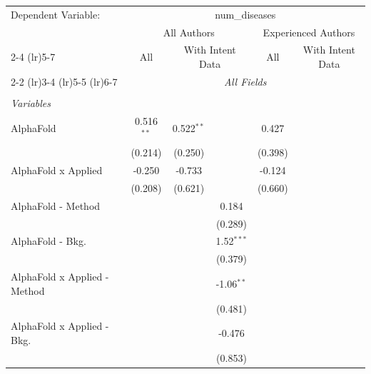 \begingroup
\centering
\begin{tabular}{lcccccc}
   \tabularnewline \midrule \midrule
   Dependent Variable: & \multicolumn{6}{c}{num\_diseases}\\
 & \multicolumn{3}{c}{All Authors} & \multicolumn{3}{c}{Experienced Authors} \\
\cmidrule(lr){2-4} \cmidrule(lr){5-7}
 & \multicolumn{1}{c}{All} & \multicolumn{2}{c}{With Intent Data} & \multicolumn{1}{c}{All} & \multicolumn{2}{c}{With Intent Data} \\
\cmidrule(lr){2-2} \cmidrule(lr){3-4} \cmidrule(lr){5-5} \cmidrule(lr){6-7}
 & \multicolumn{6}{c}{\textit{All Fields}} \\ \\
   \emph{Variables}\\
   AlphaFold                      & 0.516$^{**}$ & 0.522$^{**}$  &              & 0.427        &        &   \\   
                                  & (0.214)      & (0.250)       &              & (0.398)      &        &   \\   
   AlphaFold x Applied            & -0.250       & -0.733        &              & -0.124       &        &   \\   
                                  & (0.208)      & (0.621)       &              & (0.660)      &        &   \\   
   AlphaFold - Method             &              &               & 0.184        &              &        &   \\   
                                  &              &               & (0.289)      &              &        &   \\   
   AlphaFold - Bkg.               &              &               & 1.52$^{***}$ &              &        &   \\   
                                  &              &               & (0.379)      &              &        &   \\   
   AlphaFold x Applied - Method   &              &               & -1.06$^{**}$ &              &        &   \\   
                                  &              &               & (0.481)      &              &        &   \\   
   AlphaFold x Applied - Bkg.     &              &               & -0.476       &              &        &   \\   
                                  &              &               & (0.853)      &              &        &   \\   

\end{tabular}
